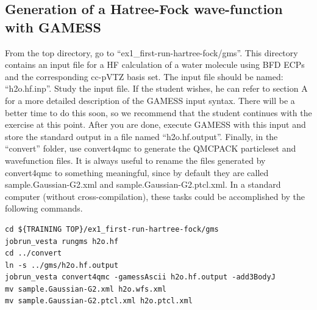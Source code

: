 \subsection{Generation of a Hatree-Fock wave-function with GAMESS}

From the top directory, go to ``ex1\_first-run-hartree-fock/gms''. This directory contains an input
file for a HF calculation of a water molecule using BFD ECPs and the corresponding
cc-pVTZ basis set. The input file should be named: “h2o.hf.inp”. Study the input
file. If the student wishes, he can refer to section A for a more detailed description of the
GAMESS input syntax. There will be a better time to do this soon, so we recommend
that the student continues with the exercise at this point. After you are done, execute
GAMESS with this input and store the standard output in a file named ``h2o.hf.output''.
Finally, in the ``convert'' folder, use convert4qmc to generate the QMCPACK particleset and wavefunction files. It
is always useful to rename the files generated by convert4qmc to something meaningful,
since by default they are called sample.Gaussian-G2.xml and sample.Gaussian-G2.ptcl.xml.
In a standard computer (without cross-compilation), these tasks could be accomplished by
the following commands.
\begin{shaded}
\begin{verbatim}
cd ${TRAINING TOP}/ex1_first-run-hartree-fock/gms
jobrun_vesta rungms h2o.hf 
cd ../convert
ln -s ../gms/h2o.hf.output
jobrun_vesta convert4qmc -gamessAscii h2o.hf.output -add3BodyJ
mv sample.Gaussian-G2.xml h2o.wfs.xml
mv sample.Gaussian-G2.ptcl.xml h2o.ptcl.xml
\end{verbatim}
\end{shaded}
\noindent

